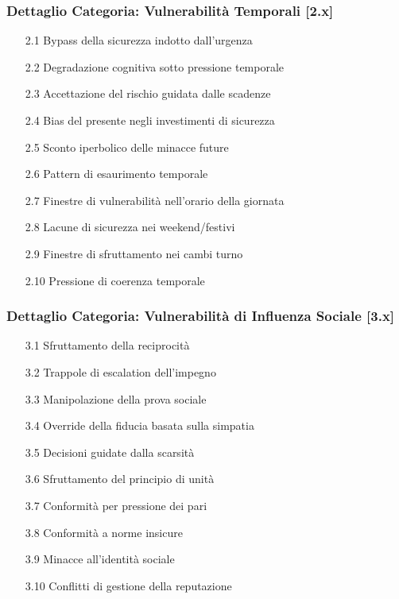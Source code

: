 \documentclass[11pt,a4paper]{article}
\begin{document}
\subsubsection{Dettaglio Categoria: Vulnerabilità Temporali [2.x]}

\begin{enumerate}
\item[2.1] Bypass della sicurezza indotto dall'urgenza
\item[2.2] Degradazione cognitiva sotto pressione temporale
\item[2.3] Accettazione del rischio guidata dalle scadenze
\item[2.4] Bias del presente negli investimenti di sicurezza
\item[2.5] Sconto iperbolico delle minacce future
\item[2.6] Pattern di esaurimento temporale
\item[2.7] Finestre di vulnerabilità nell'orario della giornata
\item[2.8] Lacune di sicurezza nei weekend/festivi
\item[2.9] Finestre di sfruttamento nei cambi turno
\item[2.10] Pressione di coerenza temporale
\end{enumerate}

\subsubsection{Dettaglio Categoria: Vulnerabilità di Influenza Sociale [3.x]}

\begin{enumerate}
\item[3.1] Sfruttamento della reciprocità
\item[3.2] Trappole di escalation dell'impegno
\item[3.3] Manipolazione della prova sociale
\item[3.4] Override della fiducia basata sulla simpatia
\item[3.5] Decisioni guidate dalla scarsità
\item[3.6] Sfruttamento del principio di unità
\item[3.7] Conformità per pressione dei pari
\item[3.8] Conformità a norme insicure
\item[3.9] Minacce all'identità sociale
\item[3.10] Conflitti di gestione della reputazione
\end{enumerate}
\end{document}
